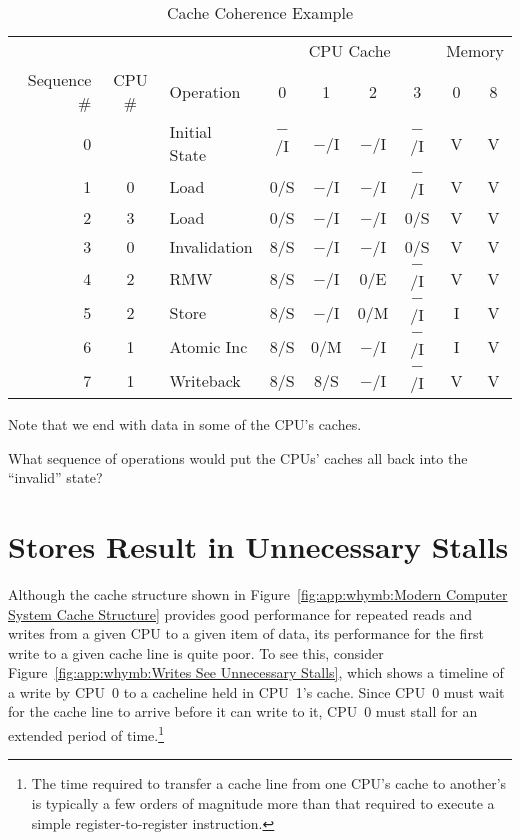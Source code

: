 \begin{table*}
\small
\centering
\begin{tabular}{r|c|l||c|c|c|c||c|c}
	& & & \multicolumn{4}{c||}{CPU Cache} & \multicolumn{2}{c}{Memory} \\
	\cline{4-7}
	Sequence \# & CPU \# & Operation & 0 & 1 & 2 & 3 & 0 & 8 \\
	\hline
	\hline
	0 &   & Initial State	& $-$/I & $-$/I & $-$/I & $-$/I   & V & V \\
	\hline
	1 & 0 & Load		& 0/S &   $-$/I & $-$/I & $-$/I   & V & V \\
	\hline
	2 & 3 & Load		& 0/S &   $-$/I & $-$/I & 0/S     & V & V \\
	\hline
	3 & 0 & Invalidation	& 8/S &   $-$/I & $-$/I & 0/S     & V & V \\
	\hline
	4 & 2 & RMW		& 8/S &   $-$/I & 0/E &   $-$/I   & V & V \\
	\hline
	5 & 2 & Store		& 8/S &   $-$/I & 0/M &   $-$/I   & I & V \\
	\hline
	6 & 1 & Atomic Inc	& 8/S &   0/M &   $-$/I & $-$/I   & I & V \\
	\hline
	7 & 1 & Writeback	& 8/S &   8/S &   $-$/I & $-$/I   & V & V \\
\end{tabular}
\caption{Cache Coherence Example}
\label{tab:app:whymb:Cache Coherence Example}
\end{table*}

Note that we end with data in some of the CPU's caches.

\QuickQuiz{}
	What sequence of operations would put the CPUs' caches
	all back into the ``invalid'' state?
 \QuickQuizEnd

\section{Stores Result in Unnecessary Stalls}
\label{sec:app:whymb:Stores Result in Unnecessary Stalls}

Although the cache structure shown in
Figure~\ref{fig:app:whymb:Modern Computer System Cache Structure}
provides good performance for repeated reads and writes from a given CPU
to a given item of data, its performance for the first write to
a given cache line is quite poor.
To see this, consider
Figure~\ref{fig:app:whymb:Writes See Unnecessary Stalls},
which shows a timeline of a write by CPU~0 to a cacheline held in
CPU~1's cache.
Since CPU~0 must wait for the cache line to arrive before it can
write to it, CPU~0 must stall for an extended period of time.\footnote{
	The time required to transfer a cache line from one CPU's cache
	to another's is typically a few orders of magnitude more than
	that required to execute a simple register-to-register instruction.}

